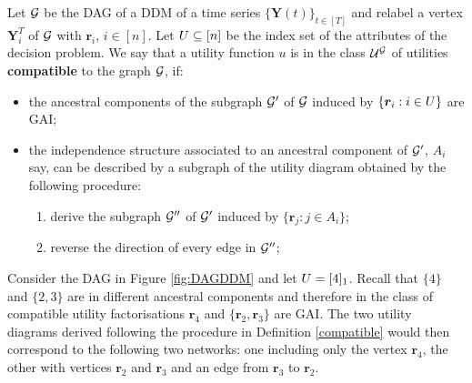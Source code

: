 \begin{definition}
\label{compatible}
 Let $\mathcal{G}$ be the DAG of a DDM of a time series $\{\bm{Y}(t)\}_{t\in [T]}$ and relabel a vertex $\bm{Y}^T_i$ of $\mathcal{G}$ with $\bm{r}_i$, $i\in[n]$. Let $U\subseteq [n]$  be the index set of the attributes of the decision problem. We say that a utility function $u$ is in the class $\mathcal{U}^{\mathcal{G}}$ of utilities \textbf{compatible} to the graph $\mathcal{G}$, if:
\begin{itemize}
\item the ancestral components of the subgraph $\mathcal{G}'$ of $\mathcal{G}$ induced by $\{\bm{r}_i:i\in U\}$ are GAI;
\item the independence structure associated to an ancestral component of $\mathcal{G}'$, $A_i$ say, can be described by a subgraph of the utility diagram obtained by the following procedure:
\begin{enumerate}
\item derive the subgraph $\mathcal{G}''$ of $\mathcal{G}'$ induced by $\{\bm{r}_j:j\in A_i\}$; 
\item reverse the direction of every edge in $\mathcal{G}''$;
\end{enumerate} 
\end{itemize}
\end{definition}

\begin{example}
\label{ex:utcomp}
Consider the DAG in Figure \ref{fig:DAGDDM} and let $U=[4]_1$. Recall that $\{4\}$ and $\{2,3\}$ are in different ancestral components and therefore in the class of compatible utility factorisations $\bm{r}_4$ and $\{\bm{r}_2,\bm{r}_3\}$ are GAI. The two utility diagrams derived following the procedure in Definition \ref{compatible} would then correspond to the following two networks: one including only the vertex $\bm{r}_4$, the other with vertices $\bm{r}_2$ and $\bm{r}_3$ and an edge from $\bm{r}_3$ to $\bm{r}_2$. 
\end{example}

